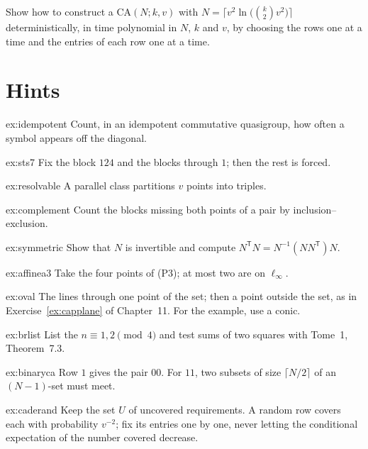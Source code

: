 \begin{exercise}[$\star\star$]\label{ex:caderand}
Show how to construct a $\mathrm{CA}(N;k,v)$ with $N=\bigl\lceil v^2\ln\bigl(\binom k2v^2\bigr)\bigr\rceil$ deterministically, in time polynomial in $N$, $k$ and $v$, by choosing the rows one at a time and the entries of each
row one at a time.
\end{exercise}

\section{Hints}

\begin{hint}{ex:idempotent}
Count, in an idempotent commutative quasigroup, how often a symbol appears off the diagonal.
\end{hint}
\begin{hint}{ex:sts7}
Fix the block $124$ and the blocks through $1$; then the rest is forced.
\end{hint}
\begin{hint}{ex:resolvable}
A parallel class partitions $v$ points into triples.
\end{hint}
\begin{hint}{ex:complement}
Count the blocks missing both points of a pair by inclusion--exclusion.
\end{hint}
\begin{hint}{ex:symmetric}
Show that $N$ is invertible and compute $N^{\mathsf T}N=N^{-1}(NN^{\mathsf T})N$.
\end{hint}
\begin{hint}{ex:affinea3}
Take the four points of (P3); at most two are on $\ell_\infty$.
\end{hint}
\begin{hint}{ex:oval}
The lines through one point of the set; then a point outside the set, as in Exercise~\ref{ex:capplane} of Chapter~11. For the example, use a conic.
\end{hint}
\begin{hint}{ex:brlist}
List the $n\equiv1,2\pmod 4$ and test sums of two squares with Tome~1, Theorem~7.3.
\end{hint}
\begin{hint}{ex:binaryca}
Row $1$ gives the pair $00$. For $11$, two subsets of size $\lceil N/2\rceil$ of an $(N-1)$-set must meet.
\end{hint}
\begin{hint}{ex:caderand}
Keep the set $U$ of uncovered requirements. A random row covers each with probability $v^{-2}$; fix its entries one by one, never letting the conditional expectation of the number covered decrease.
\end{hint}


